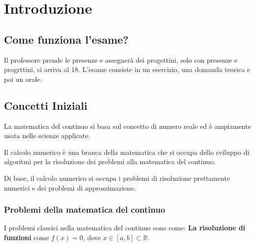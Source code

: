 \chapter{Introduzione}
\section{Come funziona l'esame?}
Il professore prende le presenze e assegnerà dei progettini, solo con presenze e progrttini, si arriva al 18.
L'esame consiste in un esercizio, una domanda teorica e poi un orale.

\section{Concetti Iniziali}
\begin{definition}
    La matematica del continuo si basa sul concetto di numero reale ed è ampiamente usata nelle scienze applicate. 
\end{definition}
\begin{definition}
    Il calcolo numerico è una branca della matematica che si occupa dello sviluppo di algoritmi per la risoluzione 
    dei problemi alla matematica del continuo.
\end{definition}
Di base, il calcolo numerico si occupa i problemi di risoluzione prettamente numerici e dei problemi di 
approssimazione.

\subsection{Problemi della matematica del continuo}
I problemi classici nella matematica del continuo sono come:
\textbf{La risoluzione di funzioni} come $\mathit{f}(x) = 0$, dove $x \in [a,b] \subset \mathbb{R}$.

